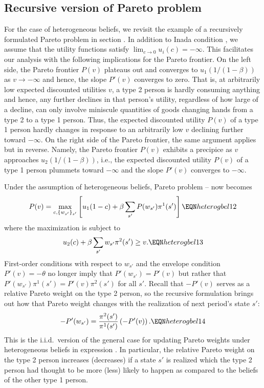 \subsection{Recursive version of Pareto problem}

For the case of heterogeneous beliefs, we 
revisit the example of a recursively formulated
Pareto problem in section .
In addition to Inada condition , we 
assume that the utility functions satisfy 
$\lim_{c \rightarrow 0} u_i(c) = -\infty$. This
facilitates our analysis with the following 
implications for the Pareto frontier. On the left 
side, the Pareto frontier $P(v)$ plateaus 
out and converges to $u_1(1/(1-\beta))$ as 
$v \rightarrow -\infty$ and hence, the slope $P'(v)$
converges to zero. That is, at arbitrarily low 
expected discounted utilities $v$, a type 2 person
is hardly consuming anything and hence, any further 
declines in that person's utility, regardless of how 
large of a decline, can only involve miniscule 
quantities of goods changing hands from a type 2 to
a type 1 person. Thus, the expected  
discounted utility $P(v)$ of a type 1 person
hardly changes in response to an arbitrarily low 
$v$ declining further toward $-\infty$. On 
the right side of the Pareto frontier, the same 
argument applies but in reverse. Namely, the Pareto
frontier $P(v)$ exhibits a precipice as $v$ 
approaches $u_2(1/(1-\beta))$, i.e., the expected
discounted utility $P(v)$ of a type 1 person
plummets toward $-\infty$ and the slope $P'(v)$
converges to $-\infty$.

Under the assumption of heterogeneous beliefs,
Pareto problem --
now becomes
$$ P(v) = \max_{c, \{w_{s'} \}_{s'} } \left[ u_1(1-c) 
   + \beta \sum_{s'} P(w_{s'}) \pi^1(s') \right] 
                                      \EQN heterogbel12 $$
where the maximization is subject to
$$ u_2(c) + \beta \sum_{s'} w_{s'} \pi^2(s') \geq v .
                                      \EQN heterogbel13 $$
First-order conditions with respect to $w_{s'}$ 
and the envelope condition $P'(v) = -\theta$ no longer
imply that $P'(w_{s'})=P'(v)$ but rather that 
$P'(w_{s'}) \pi^1(s') =P'(v) \pi^2(s')$ for all $s'$. 
Recall that $-P'(v)$ serves as a relative Pareto weight
on the type 2 person, so the recursive formulation  
brings out how that Pareto weight changes with
the realization of next period's state $s'$:
$$
-P'(w_{s'})= {\frac{\pi^2(s')}{\pi^1(s')}} 
              \left(-P'(v)\right) .     \EQN heterogbel14 $$
This is the i.i.d.\ version of the general case 
for updating Pareto weights under heterogeneous 
beliefs in expression . 
In particular, the relative Pareto weight on the 
type 2 person increases (decreases) if a state $s'$
is realized which the type 2 person had thought
to be more (less) likely to happen as compared to 
the beliefs of the other type 1 person. 

